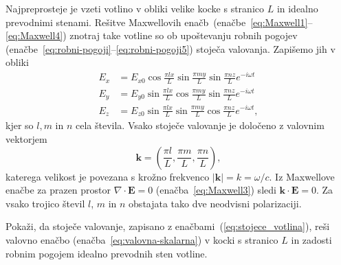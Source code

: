Najpreprosteje je vzeti votlino v obliki velike kocke s stranico
$L$ in idealno prevodnimi stenami. Rešitve Maxwellovih enačb~(enačbe~\ref{eq:Maxwell1}--\ref{eq:Maxwell4}) 
znotraj take votline so ob upoštevanju robnih pogojev 
(enačbe~\ref{eq:robni-pogoji}--\ref{eq:robni-pogoji5}) 
stoječa valovanja. Zapišemo jih v obliki
\begin{align}
E_{x} & =  E_{x0}\cos\frac{\pi lx}{L}\sin\frac{\pi my}{L}\sin\frac{\pi nz}{L}e^{-i\omega t}\nonumber \\
E_{y} & =  E_{y0}\sin\frac{\pi lx}{L}\cos\frac{\pi my}{L}\sin\frac{\pi nz}{L}e^{-i\omega t}\nonumber \\
E_{z} & =  E_{z0}\sin\frac{\pi lx}{L}\sin\frac{\pi my}{L}\cos\frac{\pi nz}{L}e^{-i\omega t},
\label{eq:stojece_votlina}
\end{align}
kjer so $l,m$ in $n$ cela števila. Vsako stoječe valovanje je določeno z valovnim 
vektorjem
\begin{equation}
\mathbf{k}=\left(\frac{\pi l}{L},\frac{\pi m}{L},\frac{\pi n}{L}\right),
\end{equation} 
katerega velikost je povezana s krožno frekvenco $|\mathbf{k}|= k = \omega/c$.
Iz Maxwellove enačbe za prazen prostor $\nabla\cdot\mathbf{E}=0$ (enačba~\ref{eq:Maxwell3})
sledi $\mathbf{k}\cdot\mathbf{E}=0$. 
Za vsako trojico števil $l$, $m$ in $n$ obstajata tako dve
neodvisni polarizaciji.

\begin{definition}
 Pokaži, da stoječe valovanje, zapisano z enačbami~(\ref{eq:stojece_votlina}), reši 
 valovno enačbo (enačba~\ref{eq:valovna-skalarna}) v 
 kocki s stranico $L$ in zadosti robnim pogojem idealno prevodnih sten votline.
\end{definition}

